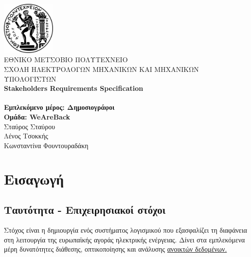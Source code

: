 \documentclass[a4paper,12pt, oneside]{article}
\begin{document}
\begin{titlepage}
\begin{center}

\includegraphics[width=0.20\textwidth]{./img/NTUAlogo.jpg}~\\[0.1cm]
\textsc{ ΕΘΝΙΚΟ ΜΕΤΣΟΒΙΟ ΠΟΛΥΤΕΧΝΕΙΟ}\\[0.2cm]  
\textsc{ ΣΧΟΛΗ ΗΛΕΚΤΡΟΛΟΓΩΝ ΜΗΧΑΝΙΚΩΝ ΚΑΙ ΜΗΧΑΝΙΚΩΝ ΥΠΟΛΟΓΙΣΤΩΝ}\\[3cm] 


\textbf{\LARGE \textlatin{Stakeholders Requirements Specification}}\\[0.01cm]
\\[2cm]

\textbf{\Large Εμπλεκόμενο μέρος: Δημοσιογράφοι}\\[2cm]

\textbf{Ομάδα:  \textlatin{WeAreBack}}\\
	Σταύρος Σταύρου \\
	Λένος Τσοκκής \\ 
	Κωνσταντίνα Φουντουραδάκη
\vfill

\end{center} 
\end{titlepage}

\thispagestyle{empty}
\newpage

\thispagestyle{empty}
\setcounter{page}{2}
\tableofcontents
\newpage


\section{Εισαγωγή}
\subsection{Ταυτότητα - Επιχειρησιακοί στόχοι}
Στόχος είναι η δημιουργία ενός συστήματος λογισμικού που εξασφαλίζει τη διαφάνεια στη λειτουργία της ευρωπαϊκής αγοράς ηλεκτρικής ενέργειας. Δίνει στα εμπλεκόμενα μέρη δυνατότητες διάθεσης, οπτικοποίησης και ανάλυσης \href{https://transparency.entsoe.eu}{ανοικτών δεδομένων.}
\end{document}
